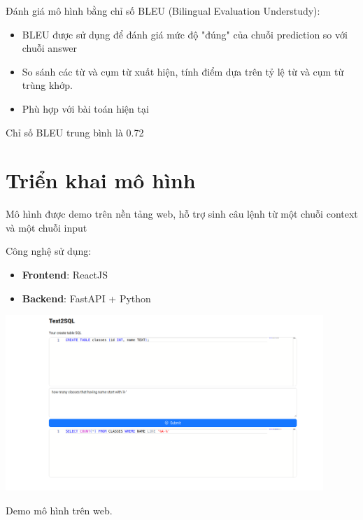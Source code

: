 \documentclass[a4paper, 10pt]{article}
\begin{document}
Đánh giá mô hình bằng chỉ số BLEU (Bilingual Evaluation Understudy):
\begin{itemize}
    \item BLEU được sử dụng để đánh giá mức độ "đúng" của chuỗi prediction so với chuỗi answer
    \item So sánh các từ và cụm từ xuất hiện, tính điểm dựa trên tỷ lệ từ và cụm từ trùng khớp.
    \item Phù hợp với bài toán hiện tại
\end{itemize}
Chỉ số BLEU trung bình là 0.72

\section{Triển khai mô hình}
Mô hình được demo trên nền tảng web, hỗ trợ sinh câu lệnh từ một chuỗi context và một chuỗi input

Công nghệ sử dụng:
\begin{itemize}
    \item \textbf{Frontend}: ReactJS
    \item \textbf{Backend}: FastAPI + Python
\end{itemize}

\begin{minipage}{\linewidth}
    \captionsetup{type=figure}
    \centering
    \includegraphics[width=12cm]{./demo.png}
    \caption{Demo mô hình trên web.}
\end{minipage}

\newpage
\printbibliography
\end{document}
